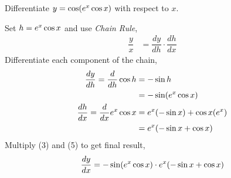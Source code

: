 

\question Differentiate $y=\cos(e^x\cos x)$ with respect to $x$.

\insertQR{}

\watchout


\begin{solution}
  Set $h=e^x\cos x$ and use \textit{Chain Rule},
  \begin{align}
    \dfrac{y}{x} &= \dfrac{dy}{dh}\cdot\dfrac{dh}{dx}
  \end{align}
  Differentiate each component of the chain,
  \begin{align}
    \dfrac{dy}{dh}=\dfrac{d}{dh} \cos h
                 &= -\sin h \\
                 &= -\sin(e^x\cos x) \\
    \dfrac{dh}{dx}=\dfrac{d}{dx}e^x\cos x
                 &= e^x(-\sin x) + \cos x(e^x)\\
                 &= e^x(-\sin x+ \cos x)
  \end{align}
  Multiply (3) and (5) to get final result,
  \begin{align}
    \dfrac{dy}{dx} = -\sin(e^x\cos x)\cdot e^x(-\sin x+ \cos x)
  \end{align}
\end{solution}

